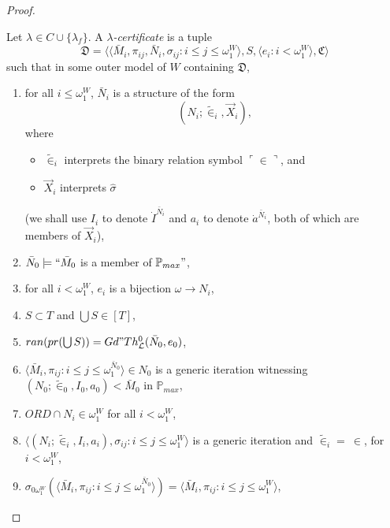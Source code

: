 \documentclass[12pt]{article}
\numberwithin{equation}{section}
\begin{document}
\begin{proof}
\begin{defi}\label{def437}
Let $\lambda \in C \cup \{\lambda_f\}$. A $\lambda$\emph{-certificate} is a tuple 
\begin{equation*}
    \mathfrak{D} = \langle \langle \bar{M}_i, \pi_{ij},  \bar{N}_i, \sigma_{ij} : i \leq j \leq \omega_1^{W} \rangle, S, \langle e_i : i < \omega_1^W \rangle, \mathfrak{C} \rangle
\end{equation*}
such that in some outer model of $W$ containing $\mathfrak{D}$,
\begin{enumerate}[label=(C\arabic*)$_{\lambda}$, leftmargin=40pt]
    \item\label{cd0} for all $i \leq \omega_1^W$, $\bar{N}_i$ is a structure of the form
    \begin{equation*}
        (N_i; \tilde{\in}_i, \Vec{X}_i) \text{,}
    \end{equation*}
    where 
    \begin{itemize}
        \item $\tilde{\in}_i$ interprets the binary relation symbol $\ulcorner \in \urcorner$, and
        \item $\Vec{X}_i$ interprets $\hat{\sigma}$ 
    \end{itemize}
    (we shall use $I_i$ to denote $\dot{I}^{\bar{N}_i}$ and $a_i$ to denote $\dot{a}^{\bar{N}_i}$, both of which are members of $\Vec{X}_i$),
    \item\label{cd1} $\bar{N}_0 \models ``\bar{M}_0$ is a member of $\mathbb{P}_{max}"$,
    \item\label{cd1.5} for all $i < \omega_1^W$, $e_i$ is a bijection $\omega \longrightarrow N_i$,
    \item\label{cd2} $S \subset T$ and $\bigcup S \in [T]$,
    \item\label{cd3} $ran(pr(\bigcup S)) = Gd" Th^0_{\mathcal{L}}(\bar{N}_0, e_0)$,
    \item\label{cd4} $\langle \bar{M}_i, \pi_{ij} : i \leq j \leq \omega_1^{\bar{N}_0} \rangle \in N_0$ is a generic iteration witnessing $(N_0; \tilde{\in}_0, I_0, a_0) < \bar{M}_0$ in $\mathbb{P}_{max}$,
    \item\label{cdnew} $ORD \cap N_i \in \omega_1^W$ for all $i < \omega_1^W$,
    \item\label{cd5} $\langle (N_i; \tilde{\in}_i, I_i, a_i), \sigma_{ij} : i \leq  j \leq \omega_1^{W} \rangle$ is a generic iteration and $\tilde{\in}_i = \ \in$, for $i < \omega_1^W$,
    \item\label{cd6} $\sigma_{0\omega_1^W}(\langle \bar{M}_i, \pi_{ij} : i \leq j \leq \omega_1^{\bar{N}_0} \rangle) = \langle \bar{M}_i, \pi_{ij} : i \leq j \leq \omega_1^W \rangle$, 

\end{enumerate}
\end{defi}
\end{proof}
\end{document}
